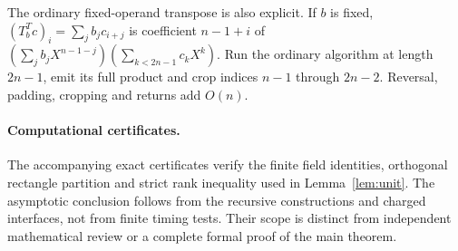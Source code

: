 \documentclass[11pt]{article}
\newcommand{\Oh}{O}
\begin{document}
The ordinary fixed-operand transpose is also explicit. If $b$ is fixed,
$(T_b^Tc)_i=\sum_jb_jc_{i+j}$ is coefficient $n-1+i$ of
$(\sum_jb_jX^{n-1-j})(\sum_{k<2n-1}c_kX^k)$. Run the ordinary algorithm
at length $2n-1$, emit its full product and crop indices $n-1$ through
$2n-2$. Reversal, padding, cropping and returns add $\Oh(n)$.

\paragraph{Computational certificates.}
The accompanying exact certificates verify the finite field identities,
orthogonal rectangle partition and strict rank inequality used in
Lemma~\ref{lem:unit}. The asymptotic conclusion follows from the
recursive constructions and charged interfaces, not from finite timing
tests. Their scope is distinct from independent mathematical review or a
complete formal proof of the main theorem.

\clearpage
\appendix







\end{document}
